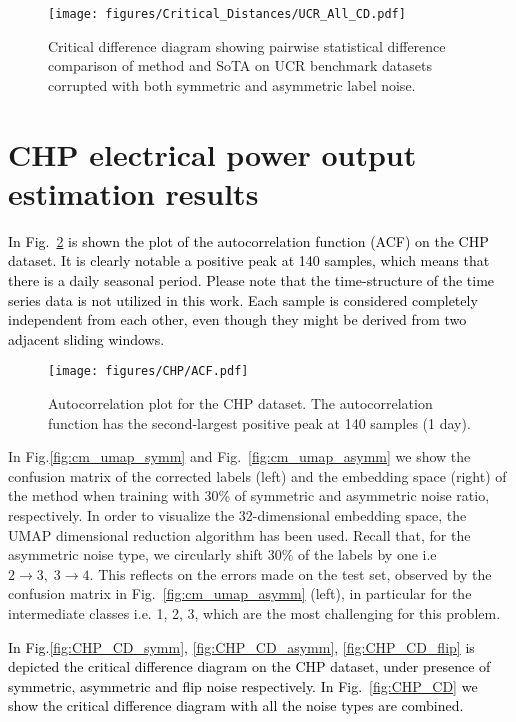 \documentclass{llncs}
\newcommand{\new}[1]{\textcolor{black}{#1}}
\begin{document}
\begin{figure}[th]
    \centering
    \texttt{[image: figures/Critical\_Distances/UCR\_All\_CD.pdf]}
    \caption{Critical difference diagram showing pairwise statistical difference comparison of \acrshort{method} and SoTA on UCR benchmark datasets corrupted with both symmetric and asymmetric label noise.}
    \label{fig:UCR_CD}
\end{figure}



\clearpage
\section{CHP electrical power output estimation results}
\new{In Fig.~\ref{fig:ACF} is shown the plot of the autocorrelation function (ACF) on the CHP dataset. It is clearly notable a positive peak at 140 samples, which means that there is a daily seasonal period.
Please note that the time-structure of the time series data is not utilized in this work. Each sample is considered completely independent from each other, even though they might be derived from two adjacent sliding windows.}

\begin{figure}[tb]
    \centering
    \texttt{[image: figures/CHP/ACF.pdf]}
    \caption{Autocorrelation plot for the CHP dataset. The autocorrelation function has the second-largest positive peak at 140 samples (1 day).}
    \label{fig:ACF}
\end{figure}


In Fig.\ref{fig:cm_umap_symm} and Fig.~\ref{fig:cm_umap_asymm} we show the confusion matrix of the corrected labels (left) and the embedding space (right) of the \acrshort{method} when training with 30\% of symmetric and asymmetric noise ratio, respectively.
In order to visualize the 32-dimensional embedding space, the UMAP dimensional reduction algorithm \cite{McInnes2018UMAPUM} has been used.
Recall that, for the asymmetric noise type, we circularly shift 30\% of the labels by one i.e $2 \to 3,\; 3 \to 4$. 
This reflects on the errors made on the test set, observed by the confusion matrix in Fig.~\ref{fig:cm_umap_asymm} (left), in particular for the intermediate classes i.e. 1, 2, 3, which are the most challenging for this problem.

\new{In Fig.\ref{fig:CHP_CD_symm}, \ref{fig:CHP_CD_asymm}, \ref{fig:CHP_CD_flip} is depicted the critical difference diagram 
on the CHP dataset, under presence of symmetric, asymmetric and flip noise respectively.
In Fig.~\ref{fig:CHP_CD} we show the critical difference diagram with all the noise types are combined.}
\end{document}
